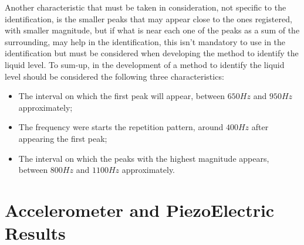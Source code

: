 Another characteristic that must be taken in consideration, not specific to the identification, is the smaller peaks that may appear close to the ones registered, with smaller magnitude, but if what is near each one of the peaks as a sum of the surrounding, may help in the identification, this isn't mandatory to use in the identification but must be considered when developing the method to identify the liquid level.
To sum-up, in the development of a method to identify the liquid level should be considered the following three characteristics:
\begin{itemize}
    \item The interval on which the first peak will appear, between $650Hz$ and $950Hz$ approximately;
    \item The frequency were starts the repetition pattern, around $400Hz$ after appearing the first peak;
    \item The interval on which the peaks with the highest magnitude appears, between $800Hz$ and $1100Hz$ approximately. 
\end{itemize}

\section{Accelerometer and PiezoElectric Results}


\clearpage
